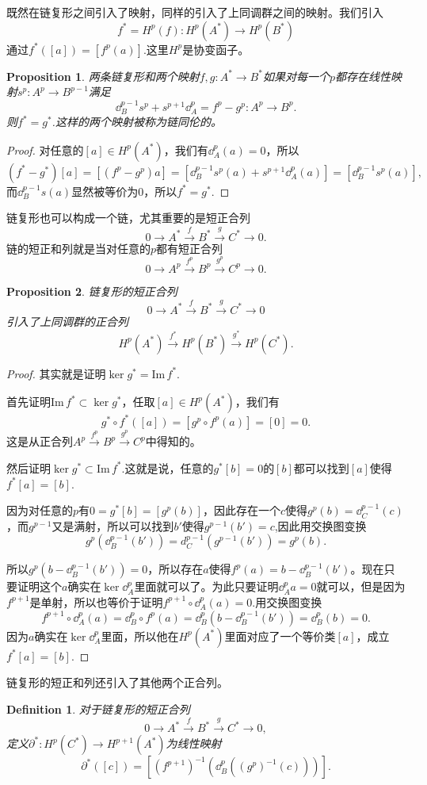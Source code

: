 \documentclass[8pt]{book}
\theoremstyle{plain}%
\newtheorem{pro}{Proposition}[section]%
\newtheorem{defi}{Definition}[section]%
\begin{document}
既然在链复形之间引入了映射，同样的引入了上同调群之间的映射。我们引入
\[
f^*=H^p(f):H^p(A^*)\to H^p(B^*)
\]
通过$f^*([a])=[f^p(a)]$.这里$H^p$是协变函子。
\begin{pro}
两条链复形和两个映射$f,g:A^*\to B^*$如果对每一个$p$都存在线性映射$s^p:A^p \to B^{p-1}$满足
\[
\dd_B^{p-1}s^p+s^{p+1}\dd_A^p=f^p-g^p:A^p\to B^p.
\]
则$f^*=g^*$.这样的两个映射被称为链同伦的。
\end{pro}
\begin{proof}
对任意的$[a]\in H^p(A^*)$，我们有$\dd_A^p(a)=0$，所以
\[
(f^*-g^*)[a]=[(f^p-g^p)a]=[\dd^{p-1}_Bs^p(a)+s^{p+1}\dd_A^p(a)]=[\dd^{p-1}_Bs^p(a)],
\]
而$\dd^{p-1}_Bs(a)$显然被等价为0，所以$f^*=g^*$.
\end{proof}
链复形也可以构成一个链，尤其重要的是短正合列
\[
0\to A^*\xrightarrow{f}B^*\xrightarrow{g}C^*\to 0.
\]
链的短正和列就是当对任意的$p$都有短正合列
\[
0\to A^p\xrightarrow{f^p}B^p\xrightarrow{g^p}C^p\to 0.
\]
\begin{pro}
链复形的短正合列
\[
0\to A^*\xrightarrow{f}B^*\xrightarrow{g}C^*\to 0
\]
引入了上同调群的正合列
\[
H^p(A^*)\xrightarrow{f^*}H^p(B^*)\xrightarrow{g^*}H^p(C^*).
\]
\end{pro}
\begin{proof}
其实就是证明$\ker g^*=\mathrm{Im}\, f^*$.

首先证明$\mathrm{Im}\, f^* \subset \ker g^*$，任取$[a]\in H^p(A^*)$，我们有
\[
g^*\circ f^*([a])=[g^p\circ f^p(a)]=[0]=0.
\]
这是从正合列$A^p\xrightarrow{f^p}B^p\xrightarrow{g^p}C^p$中得知的。

然后证明$\ker g^*\subset \mathrm{Im}\, f^*$.这就是说，任意的$g^*[b]=0$的$[b]$都可以找到$[a]$使得$f^*[a]=[b]$.

因为对任意的$p$有$0=g^*[b]=[g^p(b)]$，因此存在一个$c$使得$g^p(b)=\dd^{p-1}_C(c)$，而$g^{p-1}$又是满射，所以可以找到$b'$使得$g^{p-1}(b')=c$,因此用交换图变换
\[
g^p(\dd^{p-1}_B(b'))=d^{p-1}_C(g^{p-1}(b'))=g^p(b).
\]

所以$g^p(b-\dd^{p-1}_B(b'))=0$，所以存在$a$使得$f^p(a)=b-\dd^{p-1}_B(b')$。现在只要证明这个$a$确实在$\ker \dd^p_A$里面就可以了。为此只要证明$\dd^p_A a=0$就可以，但是因为$f^{p+1}$是单射，所以也等价于证明$f^{p+1}\circ \dd^p_A (a)=0$.用交换图变换
\[
f^{p+1}\circ \dd^p_A (a)=\dd^p_B\circ f^p (a)=\dd^p_B(b-\dd^{p-1}_B(b'))=\dd^p_B(b)=0.
\]
因为$a$确实在$\ker \dd^p_A$里面，所以他在$H^p(A^*)$里面对应了一个等价类$[a]$，成立$f^*[a]=[b]$.
\end{proof}
链复形的短正和列还引入了其他两个正合列。
\begin{defi}
对于链复形的短正合列
\[
0\to A^*\xrightarrow{f}B^*\xrightarrow{g}C^*\to 0,
\]
定义$\partial^*:H^p(C^*)\to H^{p+1}(A^*)$为线性映射
\[
\partial^*([c])=\left[(f^{p+1})^{-1}\left(\dd^p_B\left((g^p)^{-1}(c)\right)\right)\right].
\]
\end{defi}
\end{document}
